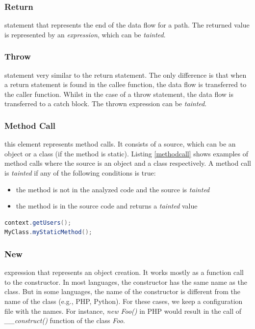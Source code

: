 \subsubsection{Return} statement that represents the end of the data flow for a path. The returned value is represented by an \textit{expression}, which can be \textit{tainted}.


\subsubsection{Throw} statement very similar to the return statement. The only difference is that when a return statement is found in the callee function, the data flow is transferred to the caller function. Whilst in the case of a throw statement, the data flow is transferred to a catch block. The thrown expression can be \textit{tainted}.


\subsubsection{Method Call} this element represents method calls. It consists of a source, which can be an object or a class (if the method is static). Listing \ref{methodcall} shows examples of method calls where the source is an object and a class respectively. A method call is \textit{tainted} if any of the following conditions is true:

\begin{itemize}
    \item the method is not in the analyzed code and the source is \textit{tainted}
    \item the method is in the source code and returns a \textit{tainted} value
\end{itemize}

\begin{lstlisting}[language=Java,
    showstringspaces=false,
    caption={Method call examples},
    label=methodcall]
context.getUsers();
MyClass.myStaticMethod();
\end{lstlisting}


\subsubsection{New} expression that represents an object creation. It works mostly as a function call to the constructor. In most languages, the constructor has the same name as the class. But in some languages, the name of the constructor is different from the name of the class (e.g., PHP, Python). For these cases, we keep a configuration file with the names. For instance, \textit{new Foo()} in PHP would result in the call of \textit{\_\_construct()} function of the class \textit{Foo}.

